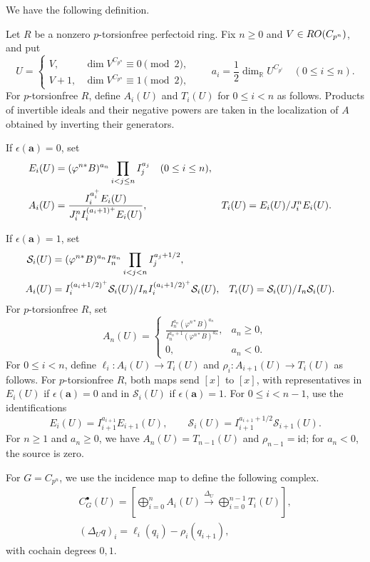 We have the following definition.

\begin{definition}\label{def:natural-degree}\label{def:operation-complexes}
Let $R$ be a nonzero $p$-torsionfree perfectoid ring.
Fix $n\ge0$ and $V\in RO(C_{p^n})$, and put
\[
U=\begin{cases}V,&\dim V^{C_{p^n}}\equiv0\pmod2,\\
V+1,&\dim V^{C_{p^n}}\equiv1\pmod2,
   \end{cases}
\qquad a_i=\frac12\dim_{\mathbb R}U^{C_{p^i}}\quad(0\le i\le n).
\]
For $p$-torsionfree $R$, define $A_i(U)$ and $T_i(U)$ for $0\le i<n$
as follows. Products of invertible ideals and their
negative powers are taken in the localization of $A$ obtained by
inverting their generators.

If $\epsilon(\mathbf a)=0$, set
\begin{align}
E_i(U)&=(\varphi^{n*}B)^{a_n}\prod_{i<j\le n}I_j^{a_j}
\quad(0\le i\le n),\notag\\
A_i(U)&=\frac{I_i^{a_i^+}E_i(U)}
                {J_i^n I_i^{(a_i+1)^+}E_i(U)},
 &T_i(U)&=E_i(U)/J_i^n E_i(U).\label{eq:uniform-complex}
\end{align}

If $\epsilon(\mathbf a)=1$, set
\begin{align}
\mathcal S_i(U)&=(\varphi^{n*}B)^{a_n}I_n^{a_n}\prod_{i<j<n}I_j^{a_j+1/2},\notag\\
A_i(U)&=I_i^{(a_i+1/2)^+}\mathcal S_i(U)/I_nI_i^{(a_i+1/2)^+}\mathcal S_i(U),
 &T_i(U)&=\mathcal S_i(U)/I_n\mathcal S_i(U).\label{eq:uniform-sign}
\end{align}
For $p$-torsionfree $R$, set
\[
A_n(U)=\begin{cases}
\displaystyle
\frac{I_n^{a_n}(\varphi^{n*}B)^{a_n}}
     {I_n^{a_n+1}(\varphi^{n*}B)^{a_n}},&a_n\ge0,\\[6pt]
0,&a_n<0.
\end{cases}
\]
For $0\le i<n$, define $\ell_i:A_i(U)\to T_i(U)$ and
$\rho_i:A_{i+1}(U)\to T_i(U)$ as follows.
For $p$-torsionfree $R$, both maps send $[x]$ to $[x]$, with
representatives in $E_i(U)$ if $\epsilon(\mathbf a)=0$ and in
$\mathcal S_i(U)$ if $\epsilon(\mathbf a)=1$.
For $0\le i<n-1$, use the identifications
\[
E_i(U)=I_{i+1}^{a_{i+1}}E_{i+1}(U),
\qquad
\mathcal S_i(U)=I_{i+1}^{a_{i+1}+1/2}\mathcal S_{i+1}(U).
\]
For $n\ge1$ and $a_n\ge0$, we have $A_n(U)=T_{n-1}(U)$ and
$\rho_{n-1}=\mathrm{id}$; for $a_n<0$, the source is zero.

For $G=C_{p^n}$, we use the incidence map to define the following complex.
\[
\begin{gathered}
C_G^\bullet(U)=
\left[\bigoplus_{i=0}^n A_i(U)\xrightarrow{\Delta_U}
\bigoplus_{i=0}^{n-1}T_i(U)\right],\\
(\Delta_Uq)_i=\ell_i(q_i)-\rho_i(q_{i+1}),
\end{gathered}
\]
with cochain degrees $0,1$.
\end{definition}

